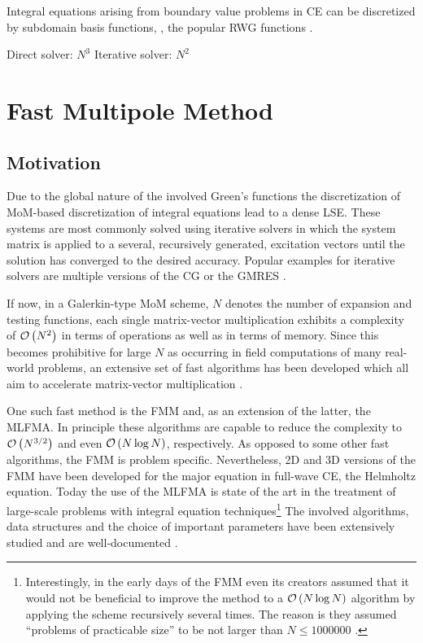 \cite{Harrington1993}

Integral equations arising from boundary value problems in \ac{CE} can be
discretized by subdomain basis functions, \eg, the popular \ac{RWG} functions
\cite{Rao1982}.

Direct solver: $N^3$
Iterative solver: $N^2$

\section{Fast Multipole Method}

\subsection{Motivation}

Due to the global nature of the involved Green's functions the discretization
of \ac{MoM}-based discretization of integral equations lead to a dense \ac{LSE}.
These systems are most commonly solved using iterative solvers in which the
system matrix is applied to a several, recursively generated, excitation
vectors until the solution has converged to the desired accuracy.
Popular examples for iterative solvers are multiple versions of the \ac{CG}
or the \ac{GMRES} \cite{Strang2010}.

If now, in a Galerkin-type \ac{MoM} scheme, $N$ denotes the number of expansion
and testing functions, each single matrix-vector multiplication exhibits a
complexity of $\mathcal{O} \left( N^2 \right)$ in terms of operations as well as in terms of
memory. Since this becomes prohibitive for large $N$ as occurring in
field computations of many real-world problems, an extensive set of fast
algorithms has been developed which all aim to accelerate matrix-vector
multiplication \cite[chapter 11]{Jin2015}.

One such fast method is the \ac{FMM} and, as an extension of the latter, the
\ac{MLFMA}. In principle these algorithms are capable to reduce the complexity
to $\mathcal{O} \left( N^{3/2} \right)$ and even $\mathcal{O} \left( N \log N \right)$, respectively.
As opposed to some other fast algorithms, the \ac{FMM} is problem
specific. 
Nevertheless, 2D \cite{Rokhlin1990} and 3D \cite{Rokhlin1993, Coifman1993}
versions of the \ac{FMM} have been developed for the major equation in
full-wave \ac{CE}, the Helmholtz equation.
Today the use of the \ac{MLFMA} is state of the art in the treatment of
large-scale problems with integral equation techniques\footnote{Interestingly,
in the early days of the \ac{FMM} even its creators assumed that it would not be
beneficial to improve the method to a $\mathcal{O} \left( N \log N \right)$ algorithm by
applying the scheme recursively several times. The reason is they assumed
\enquote{problems of practicable size} to be not larger than
$N \le \num{1000000}$ \cite{Rokhlin1993}.}
The involved algorithms, data structures and the choice of important
parameters have been extensively studied and  are well-documented
\cite{Chew2001}.

